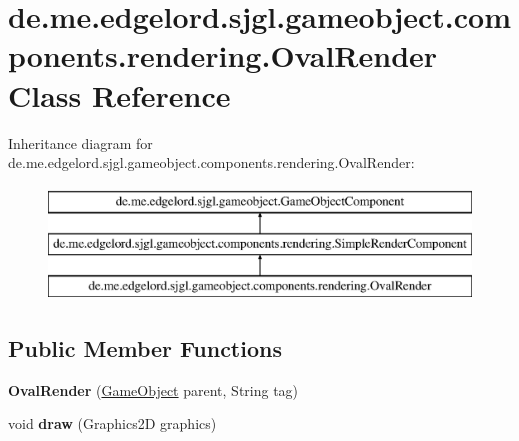 \hypertarget{classde_1_1me_1_1edgelord_1_1sjgl_1_1gameobject_1_1components_1_1rendering_1_1_oval_render}{}\section{de.\+me.\+edgelord.\+sjgl.\+gameobject.\+components.\+rendering.\+Oval\+Render Class Reference}
\label{classde_1_1me_1_1edgelord_1_1sjgl_1_1gameobject_1_1components_1_1rendering_1_1_oval_render}
Inheritance diagram for de.\+me.\+edgelord.\+sjgl.\+gameobject.\+components.\+rendering.\+Oval\+Render\+:\begin{figure}[H]
\begin{center}
\leavevmode
\includegraphics[height=3.000000cm]{classde_1_1me_1_1edgelord_1_1sjgl_1_1gameobject_1_1components_1_1rendering_1_1_oval_render}
\end{center}
\end{figure}
\subsection*{Public Member Functions}
\begin{DoxyCompactItemize}
\item 
\mbox{\label{classde_1_1me_1_1edgelord_1_1sjgl_1_1gameobject_1_1components_1_1rendering_1_1_oval_render_a06b36575c36c5b17eef9cb79ea783bf3}} 
{\bfseries Oval\+Render} (\mbox{\hyperlink{classde_1_1me_1_1edgelord_1_1sjgl_1_1gameobject_1_1_game_object}{Game\+Object}} parent, String tag)
\item 
\mbox{\label{classde_1_1me_1_1edgelord_1_1sjgl_1_1gameobject_1_1components_1_1rendering_1_1_oval_render_a08198cb65c66e27c6eb0574f4ea09c84}} 
void {\bfseries draw} (Graphics2D graphics)
\end{DoxyCompactItemize}
